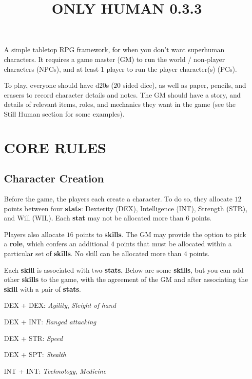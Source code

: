 \documentclass[11pt]{article}
\title{\vspace{-4ex}ONLY HUMAN 0.3.3\vspace{-6.5ex}}
\date{}
\begin{document}
\begin{multicols}{3}
  \maketitle

  A simple tabletop RPG framework, for when you don't want superhuman
  characters. It requires a game master (GM) to run the world / non-player
  characters (NPCs), and at least $1$ player to run the player character(s)
  (PCs).

  To play, everyone should have d20s ($20$ sided dice), as well as paper,
  pencils, and erasers to record character details and notes. The GM should have
  a story, and details of relevant items, roles, and mechanics they want in the
  game (see the Still Human section for some examples).
  \section*{CORE RULES}

  \subsection*{Character Creation}

  Before the game, the players each create a character. To do so, they allocate
  $12$ points between four \textbf{stats}: Dexterity (DEX), Intelligence (INT),
  Strength (STR), and Will (WIL). Each \textbf{stat} may not be allocated more
  than $6$ points.

  Players also allocate $16$ points to \textbf{skills}. The GM may provide the
  option to pick a \textbf{role}, which confers an additional $4$ points that
  must be allocated within a particular set of \textbf{skills}. No skill can be
  allocated more than $4$ points.

  Each \textbf{skill} is associated with two \textbf{stats}. Below are some
  \textbf{skills}, but you can add other \textbf{skills} to the game, with the
  agreement of the GM and after associating the \textbf{skill} with a pair of
  \textbf{stats}.

  \begin{multicols}{2}
    DEX + DEX: ​\textit{Agility​},​ \textit{Sleight of hand}

    DEX + INT: \textit{​Ranged attacking​}

    DEX + STR: ​\textit{Speed}

    DEX + SPT: ​\textit{Stealth}

    INT + INT: ​\textit{Technology​},​ \textit{Medicine}


\end{multicols}
\end{multicols}
\end{document}
